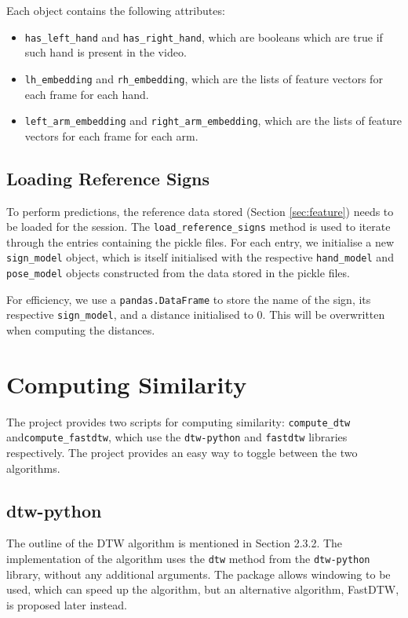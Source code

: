 \documentclass[final,rdr32.tex]{subfiles}
\begin{document}
Each object contains the following attributes:

\begin{itemize}
    \item \verb|has_left_hand| and \verb|has_right_hand|, which are booleans which are true if such hand is present in the video.
    \item \verb|lh_embedding| and \verb|rh_embedding|, which are the lists of feature vectors for each frame for each hand.
    \item \verb|left_arm_embedding| and \verb|right_arm_embedding|, which are the lists of feature vectors for each frame for each arm.
\end{itemize}

\subsection{Loading Reference Signs}

To perform predictions, the reference data stored (Section \ref{sec:feature}) needs to be loaded for the session. The \verb|load_reference_signs| method is used to iterate through the entries containing the pickle files. For each entry, we initialise a new \verb|sign_model| object, which is itself initialised with the respective \verb|hand_model| and \verb|pose_model| objects constructed from the data stored in the pickle files.

For efficiency, we use a \verb|pandas.DataFrame| to store the name of the sign, its respective \verb|sign_model|, and a distance initialised to 0. This will be overwritten when computing the distances.

\section{Computing Similarity}

The project provides two scripts for computing similarity: \verb|compute_dtw| and\newline \verb|compute_fastdtw|, which use the \verb|dtw-python|\cite{giorgino2009computing} and \verb|fastdtw| \cite{salvador2007toward} libraries respectively. The project provides an easy way to toggle between the two algorithms.

\subsection{dtw-python}
\label{sec:dtw-python}

The outline of the DTW algorithm is mentioned in Section 2.3.2. The implementation of the algorithm uses the \verb|dtw| method from the \verb|dtw-python| library, without any additional arguments. The package allows windowing to be used, which can speed up the algorithm, but an alternative algorithm, FastDTW, is proposed later instead.
\end{document}
